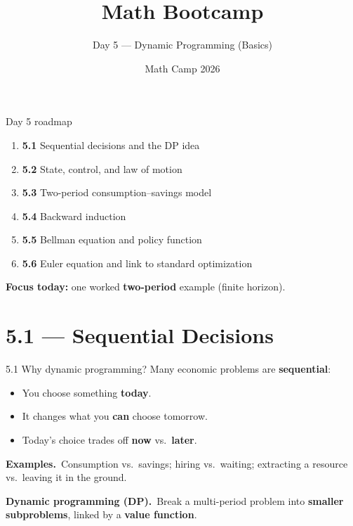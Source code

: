 \documentclass[11pt,aspectratio=169]{beamer}
\title{Math Bootcamp}
\subtitle{Day 5 --- Dynamic Programming (Basics)}
\author{Math Camp 2026}
\date{}
\begin{document}
\begin{frame}
  \titlepage
\end{frame}

\begin{frame}{Day 5 roadmap}
  \small
  \begin{enumerate}
    \item \textbf{5.1} Sequential decisions and the DP idea
    \item \textbf{5.2} State, control, and law of motion
    \item \textbf{5.3} Two-period consumption--savings model
    \item \textbf{5.4} Backward induction
    \item \textbf{5.5} Bellman equation and policy function
    \item \textbf{5.6} Euler equation and link to standard optimization
  \end{enumerate}

  \medskip
  \footnotesize
  \textbf{Focus today:} one worked \textbf{two-period} example (finite horizon).
\end{frame}

\section{5.1 --- Sequential Decisions}

\begin{frame}{5.1 Why dynamic programming?}
  \small
  Many economic problems are \textbf{sequential}:
  \begin{itemize}
    \item You choose something \textbf{today}.
    \item It changes what you \textbf{can} choose tomorrow.
    \item Today's choice trades off \textbf{now} vs.\ \textbf{later}.
  \end{itemize}

  \medskip
  \textbf{Examples.}\
  Consumption vs.\ savings; hiring vs.\ waiting; extracting a resource vs.\ leaving it in the ground.

  \medskip
  \textbf{Dynamic programming (DP).}\
  Break a multi-period problem into \textbf{smaller subproblems}, linked by a \textbf{value function}.
\end{frame}
\end{document}
